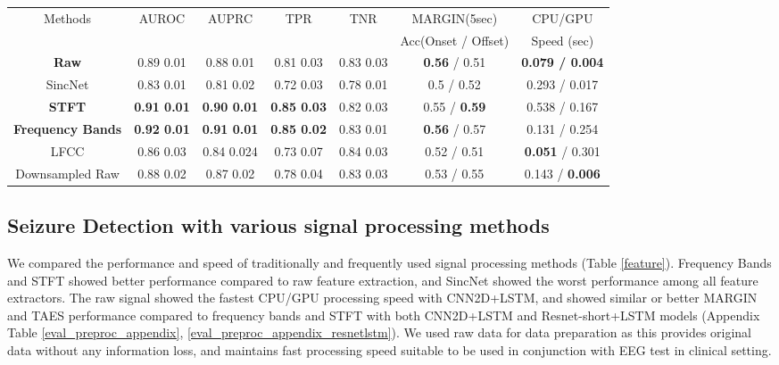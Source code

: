 \documentclass[pmlr,twocolumn,10pt]{jmlr}
\begin{document}
\begin{table*}[ht!]
	\footnotesize
	\centering
	\caption{Real-time seizure detection on bipolar TUH EEG dataset trained with each different signal process feature extractor on CNN2D + LSTM, averaged over  runs. Please see Appendix section \ref{sec: speed} for CPU and GPU settings. Detailed results can be found in Appendix Table \ref{eval_preproc_appendix}.}
	\label{feature}
	\begin{tabular}{c|cccccc}
		\toprule
		Methods & AUROC & AUPRC & TPR & TNR & MARGIN(5sec)  &  CPU/GPU\\
		&&&&& Acc(Onset / Offset) & Speed (sec)\\
		\midrule
		\textbf{Raw} 
		& 0.89  0.01
		& 0.88  0.01 
		&  0.81  0.03  
		&  0.83  0.03
		& \textbf{0.56} / 0.51 
		& \textbf{0.079 / 0.004} \\
		SincNet 
		& 0.83  0.01 
		& 0.81  0.02 
		& 0.72  0.03 
		& 0.78  0.01 
		& 0.5 / 0.52 
		& 0.293 / 0.017 
		\\
		\textbf{STFT} 
		& \textbf{0.91  0.01 }
		& \textbf{0.90  0.01}
		& \textbf{0.85  0.03 }
		& 0.82  0.03 
		& 0.55 / \textbf{0.59} 
		& 0.538 / 0.167 
		\\
		
		\textbf{Frequency Bands} 
		& \textbf{0.92  0.01}  
		& \textbf{0.91  0.01} 
		& \textbf{0.85  0.02} 
		& 0.83  0.01 
		& \textbf{0.56} / 0.57 
		& 0.131 / 0.254 
		\\
		
		LFCC & 0.86  0.03 & 0.84  0.024 & 0.73  0.07 & 0.84  0.03 & 0.52 / 0.51 & \textbf{0.051} / 0.301 \\
		Downsampled Raw & 0.88  0.02 & 0.87  0.02 &  0.78  0.04 &  0.83  0.03 & 0.53 / 0.55 & 0.143 / \textbf{0.006} \\
		\bottomrule
	\end{tabular}
\end{table*} \subsection{Seizure Detection with various signal processing methods}
We compared the performance and speed of traditionally and frequently used signal processing methods (Table \ref{feature}). Frequency Bands and STFT showed better performance compared to raw feature extraction, and SincNet \citep{ravanelli2018speaker} showed the worst performance among all feature extractors. The raw signal showed the fastest CPU/GPU processing speed with CNN2D+LSTM, and showed similar or better MARGIN and TAES performance compared to frequency bands and STFT with both CNN2D+LSTM and Resnet-short+LSTM models (Appendix Table \ref{eval_preproc_appendix}, \ref{eval_preproc_appendix_resnetlstm}). We used raw data for data preparation as this provides original data without any information loss, and maintains fast processing speed suitable to be used in conjunction with EEG test in clinical setting.
\end{document}
